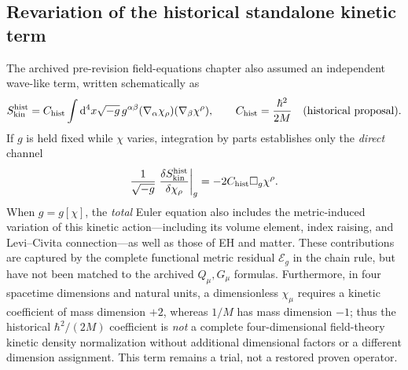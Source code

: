 \documentclass[11pt,a4paper]{article}
\newcommand{\dd}{\mathrm d}
\begin{document}
\subsection{Revariation of the historical standalone kinetic term}
The archived pre-revision field-equations chapter also assumed an independent
wave-like term, written schematically as
\begin{equation}\label{eq:qgd052-old-kinetic}
 S_{\rm kin}^{\rm hist}=C_{\rm hist}\int\dd^4x\sqrt{-g}\,
 g^{\alpha\beta}(\nabla_\alpha\chi_\rho)(\nabla_\beta\chi^\rho),
 \qquad C_{\rm hist}=\frac{\hbar^2}{2M}\quad\text{(historical proposal)}.
\end{equation}
If $g$ is held fixed while $\chi$ varies, integration by parts
establishes only the \emph{direct} channel
\begin{equation}\label{eq:qgd052-old-kinetic-var}
 \frac1{\sqrt{-g}}\left.\frac{\delta S_{\rm kin}^{\rm hist}}
 {\delta\chi_\rho}\right|_g=-2C_{\rm hist}\square_g\chi^\rho.
\end{equation}
When $g=g[\chi]$, the \emph{total} Euler equation also includes the
metric-induced variation of this kinetic action---including its volume element,
index raising, and Levi--Civita connection---as well as those of EH and matter.
These contributions are captured by the complete functional metric residual
$\mathcal E_g$ in the chain rule, but have not been matched to the archived
$Q_\mu,G_\mu$ formulas.  Furthermore, in four spacetime dimensions and
natural units, a dimensionless $\chi_\mu$ requires a kinetic coefficient of
mass dimension $+2$, whereas $1/M$ has mass dimension $-1$; thus the
historical $\hbar^2/(2M)$ coefficient is \emph{not} a complete four-dimensional
field-theory kinetic density normalization without additional dimensional
factors or a different dimension assignment.  This term remains a trial, not a
restored proven operator.
\end{document}
